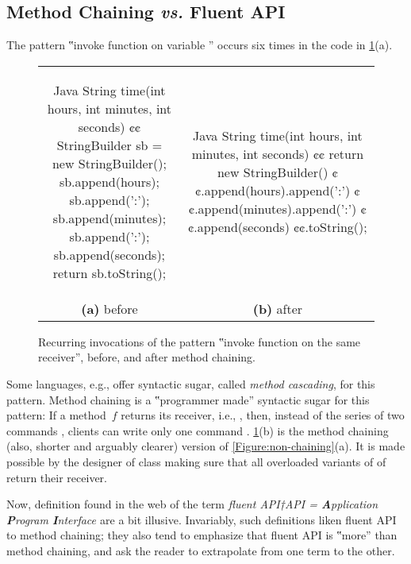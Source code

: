 \subsection{Method Chaining \emph{vs.} Fluent API}
The pattern ‟invoke function on variable ” occurs
six times in the code in \cref{Figure:chaining}(a).

\begin{figure}[H]
  \caption{\label{Figure:chaining}%
    Recurring invocations of the pattern ‟invoke function on the same
      receiver”, before, and after method chaining.
  }
  \begin{tabular}{cc}
  \begin{lcode}[minipage,width=44ex,box align=center]{Java}
String time(int hours, int minutes, int seconds) {¢¢
  StringBuilder sb = new StringBuilder();
  sb.append(hours);
  sb.append(':');
  sb.append(minutes);
  sb.append(':');
  sb.append(seconds);
  return sb.toString();
}\end{lcode}
\hfill
&
  \begin{lcode}[minipage,width=44ex,box align=center]{Java}
String time(int hours, int minutes, int seconds) {¢¢
    return new StringBuilder()
      ¢¢.append(hours).append(':')
      ¢¢.append(minutes).append(':')
      ¢¢.append(seconds)
      ¢¢.toString();
}\end{lcode}
\\
\textbf{(a)} before & \textbf{(b)} after 
\end{tabular}
\end{figure}

Some languages, e.g., \Smalltalk offer syntactic sugar, called \emph{method cascading}, for this pattern.
Method chaining is a ‟programmer made” syntactic sugar for this pattern:
  If a method~$f$ returns its receiver, i.e., ,
  then, instead of the series of two commands \mbox{}, clients can write
  only one command \mbox{}.
  \cref{Figure:chaining}(b) is the method chaining
  (also, shorter and arguably clearer) version of
  \cref{Figure:non-chaining}(a).
It is made possible by the designer of class  making sure that all overloaded variants of
  of  return their receiver.


Now, definition found in the web of the term \emph{fluent API†{API =
    \textbf Application \textbf Program \textbf Interface
}} are a bit illusive.
Invariably, such definitions liken fluent API to method chaining;
  they also tend to emphasize that fluent API is ‟more” than method
  chaining, and ask the reader to extrapolate from one term to the other.


